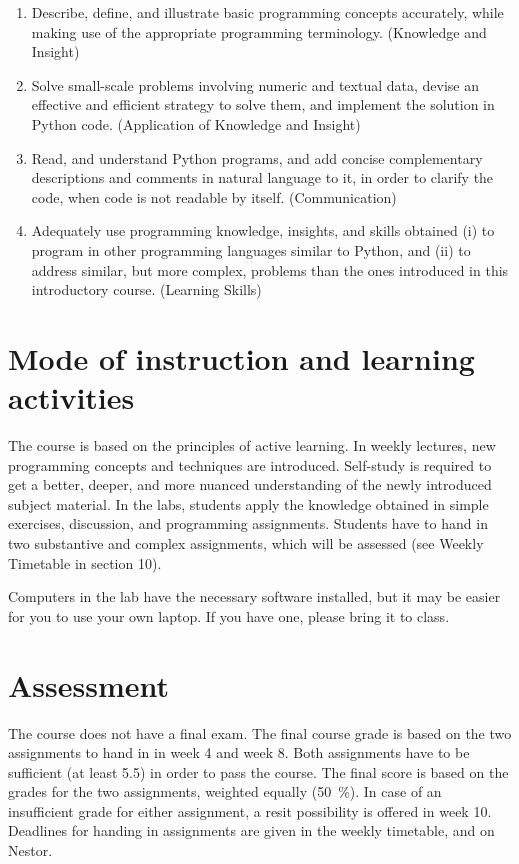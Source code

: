 \documentclass[a4paper,12pt]{article}
\begin{document}
\begin{enumerate}
    \item Describe, define, and illustrate basic programming concepts
        accurately, while making use of the appropriate programming
        terminology. (Knowledge and Insight)
    \item Solve small-scale problems involving numeric and textual data,
        devise an effective and efficient strategy to solve them,
        and implement the solution in Python code.
        (Application of Knowledge and Insight)
    \item Read, and understand Python programs, and add concise complementary
        descriptions and comments in natural language to it, in order to
        clarify the code, when code is not readable by itself. (Communication)
    \item Adequately use programming knowledge, insights, and skills obtained
        (i) to program in other programming languages similar to Python, and
        (ii) to address similar, but more complex, problems than the ones
        introduced in this introductory course. (Learning Skills)
\end{enumerate}


\section{Mode of instruction and learning activities}
The course is based on the principles of active learning. In weekly lectures,
new programming concepts and techniques are introduced. Self-study is
required to get a better, deeper, and more nuanced understanding of the newly
introduced subject material. In the labs, students apply the knowledge obtained
in simple exercises, discussion, and programming assignments. Students have to
hand in two substantive and complex assignments, which will be assessed (see
Weekly Timetable in section 10). %

Computers in the lab have the necessary software installed, but it may be
easier for you to use your own laptop. If you have one, please bring it to
class.

\section{Assessment}
The course does not have a final exam. The final course grade is based on the
two assignments to hand in in week 4 and week 8. Both assignments have to be
sufficient (at least 5.5) in order to pass the course. The final score is based
on the grades for the two assignments, weighted equally (50~\%).
In case of an insufficient grade for either assignment, a resit possibility is
offered in week 10. Deadlines for handing in assignments are given in the
weekly timetable, and on Nestor.
\end{document}
